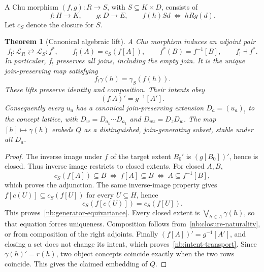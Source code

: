 \documentclass[11pt]{article}
\newtheorem{theorem}{Theorem}[section]
\theoremstyle{remark}
\begin{document}
A Chu morphism $(f,g):R\longrightarrow S$, with
$S\subseteq K\times D$, consists of
\[
 f:H\longrightarrow K,\qquad g:D\longrightarrow E,
 \qquad f(h)Sd\ \Longleftrightarrow\ hRg(d).
\]
Let $c_S$ denote the closure for $S$.

\begin{theorem}[Canonical algebraic lift]
\label{nb:lattice-lift}
A Chu morphism induces an adjoint pair
\[
 f_!: \mathcal L_R\rightleftarrows\mathcal L_S:f^*,
 \qquad f_!(A)=c_S(f[A]),\qquad f^*(B)=f^{-1}[B],
 \qquad f_!\dashv f^*.
\]
In particular, $f_!$ preserves all joins, including the empty join.
It is the unique join-preserving map satisfying
\begin{equation}
 f_!\gamma(h)=\gamma_S(f(h)).
 \label{nb:generator-equivariance}
\end{equation}
These lifts preserve identity and composition. Their intents obey
\begin{equation}
 (f_!A)'=g^{-1}[A'].
 \label{nb:intent-transport}
\end{equation}
Consequently every $u_a$ has a canonical join-preserving extension
$D_a=(u_a)_!$ to the concept lattice, with
$D_w=D_{a_k}\cdots D_{a_1}$ and $D_{wz}=D_zD_w$.
The map $[h]\mapsto\gamma(h)$ embeds $Q$ as a distinguished,
join-generating subset, stable under all $D_a$.
\end{theorem}
\begin{proof}
The inverse image under $f$ of the target extent $B_0'$ is
$(g[B_0])'$, hence is closed. Thus inverse image restricts to closed
extents. For closed $A,B$,
\[
 c_S(f[A])\subseteq B\ \Longleftrightarrow\ f[A]\subseteq B
 \ \Longleftrightarrow\ A\subseteq f^{-1}[B],
\]
which proves the adjunction. The same inverse-image property gives
$f[c(U)]\subseteq c_S(f[U])$ for every $U\subseteq H$, hence
\begin{equation}
 c_S(f[c(U)])=c_S(f[U]).
 \label{nb:closure-naturality}
\end{equation}
This proves~\eqref{nb:generator-equivariance}. Every closed extent is
$\bigvee_{h\in A}\gamma(h)$, so that equation forces uniqueness.
Composition follows from~\eqref{nb:closure-naturality}, or from composition
of the right adjoints. Finally
$(f[A])'=g^{-1}[A']$, and closing a set does not change its intent,
which proves~\eqref{nb:intent-transport}.
Since $\gamma(h)'=r(h)$, two object concepts coincide exactly when the
two rows coincide. This gives the claimed embedding of $Q$.
\end{proof}
\end{document}
